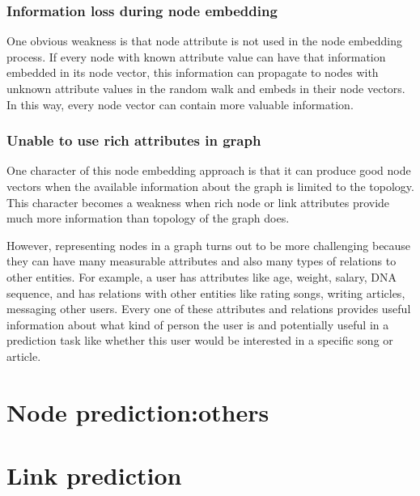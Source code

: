 \documentclass{article}
\begin{document}
\subsubsection{Information loss during node embedding}
One obvious weakness is that node attribute is not used in the node embedding process. If every node with known attribute value can have that information embedded in its node vector, this information can propagate to nodes with unknown attribute values in the random walk and embeds in their node vectors. In this way, every node vector can contain more valuable information.

\subsubsection{Unable to use rich attributes in graph}
One character of this node embedding approach is that it can produce good node vectors when the available information about the graph is limited to the topology. This character becomes a weakness when rich node or link attributes provide much more information than topology of the graph does.

However, representing nodes in a graph turns out to be more challenging because they can have many measurable attributes and also many types of relations to other entities. For example, a user has attributes like age, weight, salary, DNA sequence, and has relations with other entities like rating songs, writing articles, messaging other users. Every one of these attributes and relations provides useful information about what kind of person the user is and potentially useful in a prediction task like whether this user would be interested in a specific song or article.

\section{Node prediction:others}

\section{Link prediction}
\end{document}
